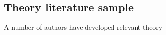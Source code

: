 \subsection{Theory literature sample\label{sec:theory-lit}}

A number of authors have developed relevant theory 
